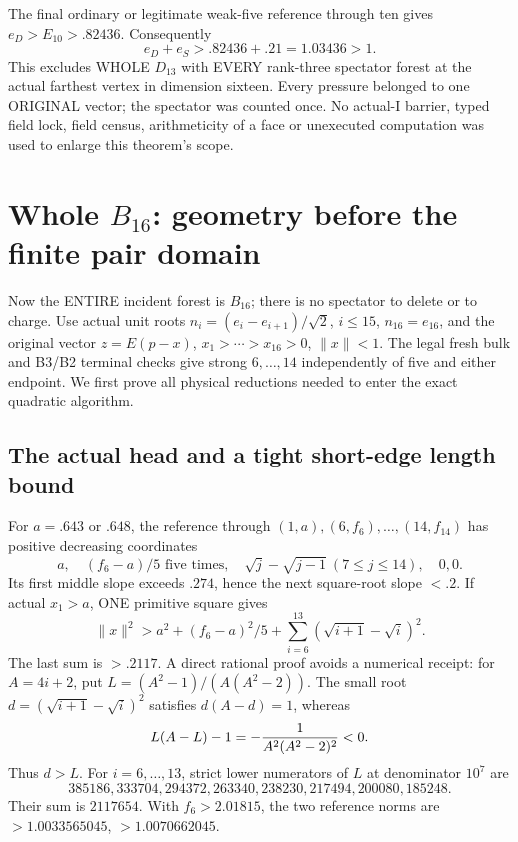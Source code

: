 The final ordinary or legitimate weak-five
reference through ten gives \(e_D>E_{10}>.82436\).
Consequently
\[
                         e_D+e_S>.82436+.21=1.03436>1.
\]
This excludes WHOLE \(D_{13}\) with EVERY rank-three
spectator forest at the actual farthest vertex in
dimension sixteen.
Every pressure belonged to one ORIGINAL vector;
the spectator was counted once.
No actual-I barrier, typed field lock, field census,
arithmeticity of a face or unexecuted computation
was used to enlarge this theorem's scope.

\section{Whole \(B_{16}\): geometry before the finite pair domain}
\label{app:arithwholeB16}

Now the ENTIRE incident forest is \(B_{16}\);
there is no spectator to delete or to charge.
Use actual unit roots
\(n_i=(e_i-e_{i+1})/\sqrt2\), \(i\le15\),
\(n_{16}=e_{16}\), and the original vector
\(z=E(p-x)\), \(x_1>\cdots>x_{16}>0\), \(\|x\|<1\).
The legal fresh bulk and B3/B2 terminal checks
give strong \(6,\ldots,14\) independently of five
and either endpoint.
We first prove all physical reductions needed
to enter the exact quadratic algorithm.

\subsection{The actual head and a tight short-edge length bound}
\label{app:arithB16edges}

For \(a=.643\) or \(.648\), the reference through
\((1,a),(6,f_6),\ldots,(14,f_{14})\) has positive
decreasing coordinates
\[
 a,\quad(f_6-a)/5\text{ five times},\quad
 \sqrt j-\sqrt{j-1}\ (7\le j\le14),\quad0,0 .
\]
Its first middle slope exceeds \(.274\), hence
the next square-root slope \(<.2\).
If actual \(x_1>a\), ONE primitive square gives
\[
 \|x\|^2>
 a^2+(f_6-a)^2/5+
             \sum_{i=6}^{13}(\sqrt{i+1}-\sqrt i)^2.
\]
The last sum is \(>.2117\).
A direct rational proof avoids a numerical receipt:
for \(A=4i+2\), put
\(L=(A^2-1)/(A(A^2-2))\).
The small root \(d=(\sqrt{i+1}-\sqrt i)^2\)
satisfies \(d(A-d)=1\), whereas
\[
                 L(A-L)-1=-{1\over A^2(A^2-2)^2}<0 .
\]
Thus \(d>L\).
For \(i=6,\ldots,13\), strict lower numerators
of \(L\) at denominator \(10^7\) are
\[
 385186,333704,294372,263340,238230,217494,200080,185248 .
\]
Their sum is \(2117654\).
With \(f_6>2.01815\), the two reference norms are
\(>1.0033565045\), \(>1.0070662045\).

